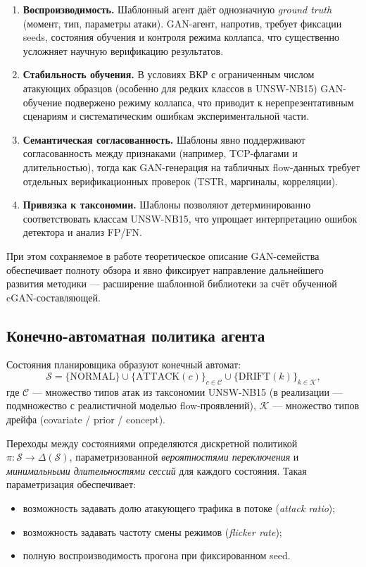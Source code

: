 \begin{enumerate}
    \item \textbf{Воспроизводимость.} Шаблонный агент даёт однозначную
    \emph{ground truth} (момент, тип, параметры атаки). GAN-агент, напротив,
    требует фиксации seeds, состояния обучения и контроля режима коллапса,
    что существенно усложняет научную верификацию результатов.
    \item \textbf{Стабильность обучения.} В условиях ВКР с ограниченным числом
    атакующих образцов (особенно для редких классов в UNSW-NB15) GAN-обучение
    подвержено режиму коллапса, что приводит к нерепрезентативным сценариям и
    систематическим ошибкам экспериментальной части.
    \item \textbf{Семантическая согласованность.} Шаблоны явно поддерживают
    согласованность между признаками (например, TCP-флагами и
    длительностью), тогда как GAN-генерация на табличных flow-данных требует
    отдельных верификационных проверок (TSTR, маргиналы, корреляции).
    \item \textbf{Привязка к таксономии.} Шаблоны позволяют детерминированно
    соответствовать классам UNSW-NB15, что упрощает интерпретацию ошибок
    детектора и анализ FP/FN.
\end{enumerate}

При этом сохраняемое в работе теоретическое описание GAN-семейства
обеспечивает полноту обзора и явно фиксирует направление дальнейшего
развития методики --- расширение шаблонной библиотеки за счёт обученной
cGAN-составляющей.

\subsection{Конечно-автоматная политика агента}

Состояния планировщика образуют конечный автомат:
\[
\mathcal{S} = \{\text{NORMAL}\} \cup
\{\text{ATTACK}(c)\}_{c \in \mathcal{C}} \cup
\{\text{DRIFT}(k)\}_{k \in \mathcal{K}},
\]
где \(\mathcal{C}\) --- множество типов атак из таксономии UNSW-NB15
(в реализации --- подмножество с реалистичной моделью flow-проявлений),
\(\mathcal{K}\) --- множество типов дрейфа (covariate / prior / concept).

Переходы между состояниями определяются дискретной политикой
\(\pi\colon \mathcal{S} \to \Delta(\mathcal{S})\), параметризованной
\emph{вероятностями переключения} и \emph{минимальными длительностями
сессий} для каждого состояния. Такая параметризация обеспечивает:
\begin{itemize}
    \item возможность задавать долю атакующего трафика в потоке (\emph{attack
    ratio});
    \item возможность задавать частоту смены режимов (\emph{flicker rate});
    \item полную воспроизводимость прогона при фиксированном seed.
\end{itemize}

